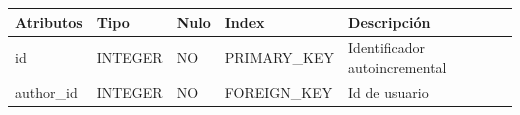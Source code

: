 \documentclass[12pt,a4paperpaper,]{report}
\begin{document}
\begin{longtable}[]{@{}lllll@{}}
\toprule
\begin{minipage}[b]{0.21\columnwidth}\raggedright\strut
Atributos\strut
\end{minipage} & \begin{minipage}[b]{0.19\columnwidth}\raggedright\strut
Tipo\strut
\end{minipage} & \begin{minipage}[b]{0.16\columnwidth}\raggedright\strut
Nulo\strut
\end{minipage} & \begin{minipage}[b]{0.19\columnwidth}\raggedright\strut
Index\strut
\end{minipage} & \begin{minipage}[b]{0.11\columnwidth}\raggedright\strut
Descripción\strut
\end{minipage}\tabularnewline
\midrule
\endhead
\begin{minipage}[t]{0.21\columnwidth}\raggedright\strut
id\strut
\end{minipage} & \begin{minipage}[t]{0.19\columnwidth}\raggedright\strut
INTEGER\strut
\end{minipage} & \begin{minipage}[t]{0.16\columnwidth}\raggedright\strut
NO\strut
\end{minipage} & \begin{minipage}[t]{0.19\columnwidth}\raggedright\strut
PRIMARY\_KEY\strut
\end{minipage} & \begin{minipage}[t]{0.11\columnwidth}\raggedright\strut
Identificador autoincremental\strut
\end{minipage}\tabularnewline
\begin{minipage}[t]{0.21\columnwidth}\raggedright\strut
author\_id\strut
\end{minipage} & \begin{minipage}[t]{0.19\columnwidth}\raggedright\strut
INTEGER\strut
\end{minipage} & \begin{minipage}[t]{0.16\columnwidth}\raggedright\strut
NO\strut
\end{minipage} & \begin{minipage}[t]{0.19\columnwidth}\raggedright\strut
FOREIGN\_KEY\strut
\end{minipage} & \begin{minipage}[t]{0.11\columnwidth}\raggedright\strut
Id de usuario\strut
\end{minipage}\tabularnewline

\end{longtable}
\end{document}
